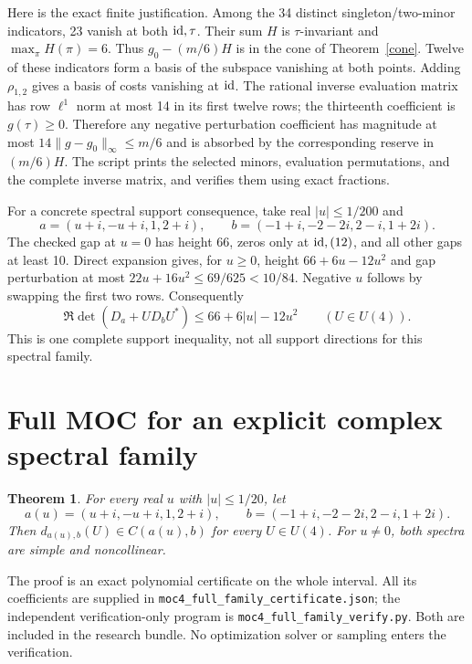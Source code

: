 \documentclass[11pt]{article}
\newtheorem{theorem}{Theorem}[section]\newtheorem{lemma}[theorem]{Lemma}\newtheorem{corollary}[theorem]{Corollary}\newtheorem{proposition}[theorem]{Proposition}
\begin{document}
Here is the exact finite justification. Among the 34 distinct singleton/two-minor indicators, 23 vanish at both $\mathrm{id},\tau$. Their sum $H$ is $\tau$-invariant and $\max_\pi H(\pi)=6$. Thus $g_0-(m/6)H$ is in the cone of Theorem~\ref{cone}. Twelve of these indicators form a basis of the subspace vanishing at both points. Adding $\rho_{1,2}$ gives a basis of costs vanishing at $\mathrm{id}$. The rational inverse evaluation matrix has row $\ell^1$ norm at most 14 in its first twelve rows; the thirteenth coefficient is $g(\tau)\ge0$. Therefore any negative perturbation coefficient has magnitude at most $14\|g-g_0\|_\infty\le m/6$ and is absorbed by the corresponding reserve in $(m/6)H$. The script prints the selected minors, evaluation permutations, and the complete inverse matrix, and verifies them using exact fractions.

For a concrete spectral support consequence, take real $|u|\le1/200$ and
\[
a=(u+i,-u+i,1,2+i),\qquad b=(-1+i,-2-2i,2-i,1+2i).
\]
The checked gap at $u=0$ has height 66, zeros only at $\mathrm{id},(12)$, and all other gaps at least 10. Direct expansion gives, for $u\ge0$, height $66+6u-12u^2$ and gap perturbation at most $22u+16u^2\le69/625<10/84$. Negative $u$ follows by swapping the first two rows. Consequently
\[
\Re\det(D_a+UD_bU^*)\le66+6|u|-12u^2\qquad(U\in U(4)).
\]
This is one complete support inequality, not all support directions for this spectral family.

\section{Full MOC for an explicit complex spectral family}\label{fullfamily}
\begin{theorem}
For every real $u$ with $|u|\le1/20$, let
\[
a(u)=(u+i,-u+i,1,2+i),\qquad
b=(-1+i,-2-2i,2-i,1+2i).
\]
Then $d_{a(u),b}(U)\in C(a(u),b)$ for every $U\in U(4)$. For $u\ne0$, both spectra are simple and noncollinear.
\end{theorem}

The proof is an exact polynomial certificate on the whole interval. All its coefficients are supplied in \nolinkurl{moc4_full_family_certificate.json}; the independent verification-only program is \nolinkurl{moc4_full_family_verify.py}. Both are included in the research bundle. No optimization solver or sampling enters the verification.
\end{document}
